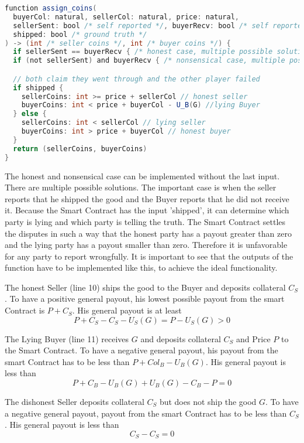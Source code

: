 \documentclass{cacthesis}
\begin{document}
\begin{lstlisting}[language=java]
function assign_coins(
  buyerCol: natural, sellerCol: natural, price: natural,
  sellerSent: bool /* self reported */, buyerRecv: bool /* self reported */, 
  shipped: bool /* ground truth */
) -> (int /* seller coins */, int /* buyer coins */) {
  if sellerSent == buyerRecv { /* honest case, multiple possible solutions  */ }
  if (not sellerSent) and buyerRecv { /* nonsensical case, multiple possible solutions */ }

  // both claim they went through and the other player failed
  if shipped {
    sellerCoins: int >= price + sellerCol // honest seller
    buyerCoins: int < price + buyerCol - U_B(G) //lying Buyer
  } else {
    sellerCoins: int < sellerCol // lying seller
    buyerCoins: int > price + buyerCol // honest buyer
  }
  return (sellerCoins, buyerCoins)
}
\end{lstlisting}
The honest and nonsensical case can be implemented without the last input. There are multiple possible solutions.\newline
The important case is when the seller reports that he shipped the good and the Buyer reports that he did not receive it. Because the Smart Contract has the input 'shipped', it can determine which party is lying and which party is telling the truth.\newline
The Smart Contract settles the disputes in such a way that the honest party has a payout greater than zero and the lying party has a payout smaller than zero. Therefore it is unfavorable for any party to report wrongfully.\newline
It is important to see that the outputs of the function have to be implemented like this, to achieve the ideal functionality.\newline

The honest Seller (line 10) ships the good to the Buyer and deposits collateral $C_S$. To have a positive general payout, his lowest possible payout from the smart Contract is $P + C_S$. His general payout is at least
\[P + C_S - C_S - U_S(G) = P - U_S(G) > 0\]

The Lying Buyer (line 11) receives $G$ and deposits collateral $C_S$ and Price $P$ to the Smart Contract. To have a negative general payout, his payout from the smart Contract has to be less than $P + Col_B - U_B(G)$. His general payout is less than
\[P + C_B - U_B(G) + U_B(G) - C_B -P = 0\]

The dishonest Seller deposits collateral $C_S$ but does not ship the good $G$. To have a negative general payout, payout from the smart Contract has to be less than $C_S$. His general payout is less than
\[C_S - C_S = 0\]
\end{document}
